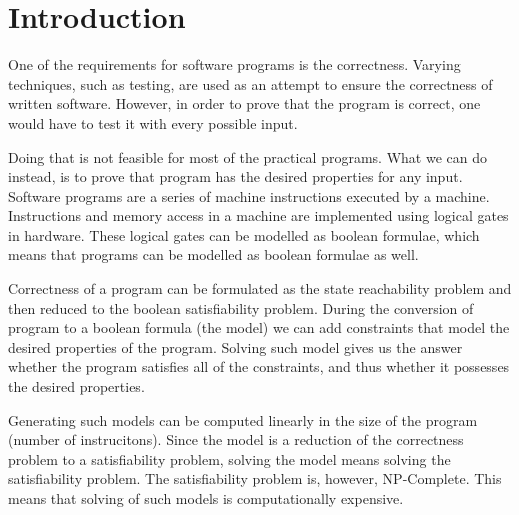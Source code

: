 \documentclass[12pt]{article}
\begin{document}
\newpage
\tableofcontents
\newpage


\section{Introduction}

One of the requirements for software programs is the correctness. Varying
techniques, such as testing, are used as an attempt to ensure the correctness
of written software. However, in order to prove that the program is correct,
one would have to test it with every possible input.

Doing that is not feasible for most of the practical programs. What we can do
instead, is to prove that program has the desired properties for any input.
Software programs are a series of machine instructions executed by a machine.
Instructions and memory access in a machine are implemented using logical gates
in hardware. These logical gates can be modelled as boolean formulae, which
means that programs can be modelled as boolean formulae as well.

Correctness of a program can be formulated as the state reachability problem
and then reduced to the boolean satisfiability problem. During the conversion
of program to a boolean formula (the model) we can add constraints that model
the desired properties of the program. Solving such model gives us the answer
whether the program satisfies all of the constraints, and thus whether it
possesses the desired properties. 

Generating such models can be computed linearly in the size of the program
(number of instrucitons). Since the model is a reduction of the correctness
problem to a satisfiability problem, solving the model means solving the
satisfiability problem. The satisfiability problem is, however, NP-Complete.
This means that solving of such models is computationally expensive. 
\end{document}
